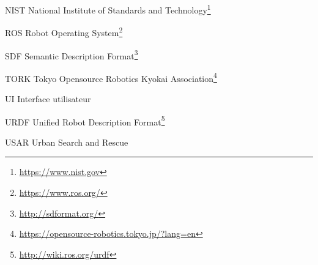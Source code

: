 \begin{listofabbr}[3cm]
\item [NIST] National Institute of Standards and Technology\footnote{\href{https://www.nist.gov/el/intelligent-systems-division-73500/standard-test-methods-response-robots}{https://www.nist.gov}}
\item [ROS] Robot Operating System\footnote{\url{https://www.ros.org/}}
\item [SDF] Semantic Description Format\footnote{\url{http://sdformat.org/}}
\item [TORK] Tokyo Opensource Robotics Kyokai Association\footnote{\url{https://opensource-robotics.tokyo.jp/?lang=en}}
\item [UI] Interface utilisateur
\item [URDF]  Unified Robot Description Format\footnote{\url{http://wiki.ros.org/urdf}}
\item [USAR] Urban Search and Rescue
\end{listofabbr}